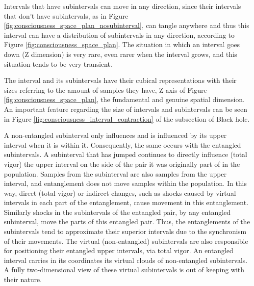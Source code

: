 Intervals that have subintervals can move in any direction, since their intervals that don't have subintervals, as in Figure \ref{fig:consciousness_space_plan_nosubinterval}, can tangle anywhere and thus this interval can have a distribution of subintervals in any direction, according to Figure \ref{fig:consciousness_space_plan}. The situation in which an interval goes down (Z dimension) is very rare, even rarer when the interval grows, and this situation tends to be very transient.

The interval and its subintervals have their cubical representations with their sizes referring to the amount of samples they have, Z-axis of Figure \ref{fig:consciousness_space_plan}, the fundamental and genuine spatial dimension. An important feature regarding the size of intervals and subintervals can be seen in Figure \ref{fig:consciousness_interval_contraction} of the subsection of Black hole.

A non-entangled subinterval only influences and is influenced by its upper interval when it is within it. Consequently, the same occurs with the entangled subintervals. A subinterval that has jumped continues to directly influence (total vigor) the upper interval on the side of the pair it was originally part of in the population. Samples from the subinterval are also samples from the upper interval, and entanglement does not move samples within the population. In this way, direct (total vigor) or indirect changes, such as shocks caused by virtual intervals in each part of the entanglement, cause movement in this entanglement. Similarly shocks in the subintervals of the entangled pair, by any entangled subinterval, move the parts of this entangled pair. Thus, the entanglements of the subintervals tend to approximate their superior intervals due to the synchronism of their movements. The virtual (non-entangled) subintervals are also responsible for positioning their entangled upper intervals, via total vigor. An entangled interval carries in its coordinates its virtual clouds of non-entangled subintervals. A fully two-dimensional view of these virtual subintervals is out of keeping with their nature.

